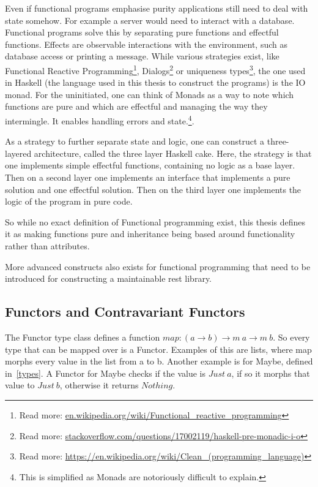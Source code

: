 \begin{description}
Even if functional programs emphasise purity applications still need to deal
        with state somehow. For example a server would need to interact with a
        database. Functional programs solve this by separating pure functions
        and effectful functions. Effects are observable interactions with the
        environment, such as database access or printing a message.  While
        various strategies exist, like Functional Reactive
        Programming\footnote{Read more:
        \url{en.wikipedia.org/wiki/Functional_reactive_programming}},
        Dialogs\footnote{Read more:
        \url{stackoverflow.com/questions/17002119/haskell-pre-monadic-i-o}} or
        uniqueness types\footnote{Read more:
        \url{https://en.wikipedia.org/wiki/Clean_(programming_language)}}, the
        one used in Haskell (the language used in this thesis to construct the
        programs) is the IO monad. For the uninitiated, one can think of Monads
        as a way to note which functions are pure and which are effectful and
        managing the way they intermingle. It enables handling errors
        and state.\footnote{This is simplified as Monads are notoriously
        difficult to explain.}. 

As a strategy to further separate state and logic, one can construct a
        three-layered architecture, called the three layer Haskell cake. Here,
        the strategy is that one implements simple effectful functions,
        containing no logic as a base layer. Then on a second layer one
        implements an interface that implements a pure solution and one
        effectful solution. Then on the third layer one implements the logic of
        the program in pure code.  
\end{description}

So while no exact definition of Functional programming exist, this thesis
defines it as making functions pure and inheritance being based around
functionality rather than attributes. 

More advanced constructs also exists for functional programming that need to be
introduced for constructing a maintainable rest library. 

\subsection{Functors and Contravariant Functors}

The Functor type class defines a function $map : (a\rightarrow b) \rightarrow m\
a \rightarrow m\ b$. So every type that can be mapped over is a Functor.
Examples of this are lists, where map morphs every value in the list from a to
b. Another example is for Maybe, defined in~\ref{types}. A Functor for Maybe
checks if the value is $Just\ a$, if so it morphs that value to $Just\ b$,
otherwise it returns $Nothing$. 

